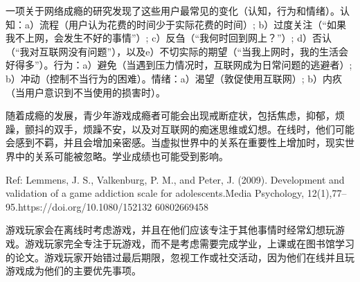 
一项关于网络成瘾的研究发现了这些用户最常见的变化（认知，行为和情绪）。认知：a）流程（用户认为花费的时间少于实际花费的时间）; b）过度关注（“如果我不上网，会发生不好的事情”）; c）反刍（“我何时回到网上？”）; d）否认（“我对互联网没有问题”），以及e）不切实际的期望（“当我上网时，我的生活会好得多”）。行为：a）避免（当遇到压力情况时，互联网成为日常问题的逃避者）; b）冲动（控制不当行为的困难）。情绪：a）渴望（敦促使用互联网）; b）内疚（当用户意识到不当使用的损害时）。


随着成瘾的发展，青少年游戏成瘾者可能会出现戒断症状，包括焦虑，抑郁，烦躁，颤抖的双手，烦躁不安，以及对互联网的痴迷思维或幻想。在线时，他们可能会感到不羁，并且会增加亲密感。当虚拟世界中的关系在重要性上增加时，现实世界中的关系可能被忽略。学业成绩也可能受到影响。

Ref: Lemmens, J. S., Valkenburg, P. M., and Peter, J. (2009). Development and validation of a game addiction scale for adolescents.Media Psychology, 12(1),77–95.https://doi.org/10.1080/152132
60802669458


游戏玩家会在离线时考虑游戏，并且在他们应该专注于其他事情时经常幻想玩游戏。游戏玩家完全专注于玩游戏，而不是考虑需要完成学业，上课或在图书馆学习的论文。游戏玩家开始错过最后期限，忽视工作或社交活动，因为他们在线并且玩游戏成为他们的主要优先事项。


